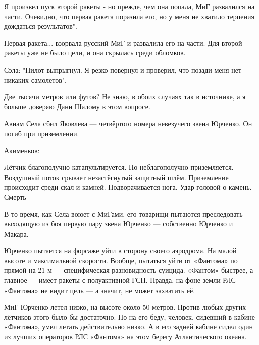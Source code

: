 \begin{textcitation}
	Я произвел пуск второй ракеты - но прежде, чем она попала, МиГ развалился на части. Очевидно, что первая ракета поразила его, но у меня не хватило терпения дождаться результатов".
	
	Первая ракета... взорвала русский МиГ и развалила его на части. Для второй ракеты уже не было цели, и она скрылась среди обломков.
	
	Сэла: "Пилот выпрыгнул. Я резко повернул и проверил, что позади меня нет никаких самолетов".
\end{textcitation}

Две тысячи метров или футов? Не знаю, в обоих случаях так в источнике, а я больше доверяю Дани Шалому в этом вопросе.

Авиам Села сбил Яковлева — четвёртого номера невезучего звена Юрченко. Он погиб при приземлении.

Акименков:

\begin{textcitation}
	Лётчик благополучно катапультируется. Но неблагополучно приземляется. Воздушный поток срывает незастёгнутый защитный шлём. Приземление происходит среди скал и камней. Подворачивается нога. Удар головой о камень. Смерть
\end{textcitation}

В то время, как Села воюет с МиГами, его товарищи пытаются преследовать выходящую из боя первую пару звена Юрченко — собственно Юрченко и Макара.

Юрченко пытается на форсаже уйти в сторону своего аэродрома. На малой высоте и максимальной скорости. Вообще, пытаться уйти от «Фантома» по прямой на 21-м — специфическая разновидность суицида. «Фантом» быстрее, а главное — имеет ракеты с полуактивной ГСН. Правда, на фоне земли РЛС «Фантома» не видит цель — а значит, не может захватить её.

МиГ Юрченко летел низко, на высоте около 50 метров. Против любых других лётчиков этого было бы достаточно. Но на его беду, человек, сидевший в кабине «Фантома», умел летать действительно низко. А в его задней кабине сидел один из лучших операторов РЛС «Фантома» на этом берегу Атлантического океана.

